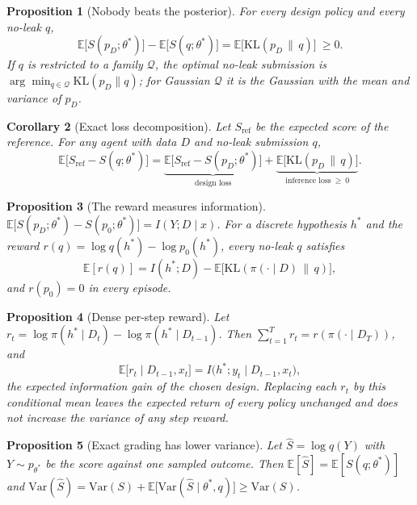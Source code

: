 \documentclass[10pt]{article}
\newtheorem{proposition}{Proposition}
\newtheorem{corollary}[proposition]{Corollary}
\theoremstyle{definition}
\theoremstyle{remark}
\theoremstyle{plain}
\newcommand{\E}{\mathbb{E}}
\newcommand{\KL}{\mathrm{KL}}
\newcommand{\thetastar}{\theta^{*}}
\begin{document}
\begin{proposition}[Nobody beats the posterior]\label{prop:bayes}
For every design policy and every no-leak $q$,
\[
\E\big[S(p_D;\thetastar)\big]-\E\big[S(q;\thetastar)\big]=\E\big[\KL(p_D\,\|\,q)\big]\ \ge 0 .
\]
If $q$ is restricted to a family $\mathcal Q$, the optimal no-leak submission is
$\arg\min_{q\in\mathcal Q}\KL(p_D\|q)$; for Gaussian $\mathcal Q$ it is the Gaussian with the mean
and variance of $p_D$.
\end{proposition}

\begin{corollary}[Exact loss decomposition]\label{cor:decomp}
Let $S_\mathrm{ref}$ be the expected score of the reference. For any agent with data $D$ and
no-leak submission $q$,
\[
\E\big[S_\mathrm{ref}-S(q;\thetastar)\big]
=\underbrace{\E\big[S_\mathrm{ref}-S(p_D;\thetastar)\big]}_{\text{design loss}}
+\underbrace{\E\big[\KL(p_D\,\|\,q)\big]}_{\text{inference loss}\ \ge\ 0}.
\]
\end{corollary}

\begin{proposition}[The reward measures information]\label{prop:info}
$\E\big[S(p_D;\thetastar)-S(p_0;\thetastar)\big]=I(Y;D\mid x)$. For a discrete hypothesis
$h^{*}$ and the reward $r(q)=\log q(h^{*})-\log p_0(h^{*})$, every no-leak $q$ satisfies
\[
\E[r(q)] = I(h^{*};D)-\E\big[\KL(\pi(\cdot\mid D)\,\|\,q)\big],
\]
and $r(p_0)=0$ in every episode.
\end{proposition}

\begin{proposition}[Dense per-step reward]\label{prop:step}
Let $r_t=\log\pi(h^{*}\mid D_t)-\log\pi(h^{*}\mid D_{t-1})$. Then $\sum_{t=1}^{T}r_t=r(\pi(\cdot\mid
D_T))$, and
\[
\E\big[r_t\mid D_{t-1},x_t\big]=I\big(h^{*};y_t\mid D_{t-1},x_t\big),
\]
the expected information gain of the chosen design. Replacing each $r_t$ by this conditional mean
leaves the expected return of every policy unchanged and does not increase the variance of any
step reward.
\end{proposition}

\begin{proposition}[Exact grading has lower variance]\label{prop:var}
Let $\hat S=\log q(Y)$ with $Y\sim p_{\thetastar}$ be the score against one sampled outcome. Then
$\E[\hat S]=\E[S(q;\thetastar)]$ and
$\mathrm{Var}(\hat S)=\mathrm{Var}(S)+\E\big[\mathrm{Var}(\hat S\mid\thetastar,q)\big]\ge\mathrm{Var}(S)$.
\end{proposition}
\end{document}
